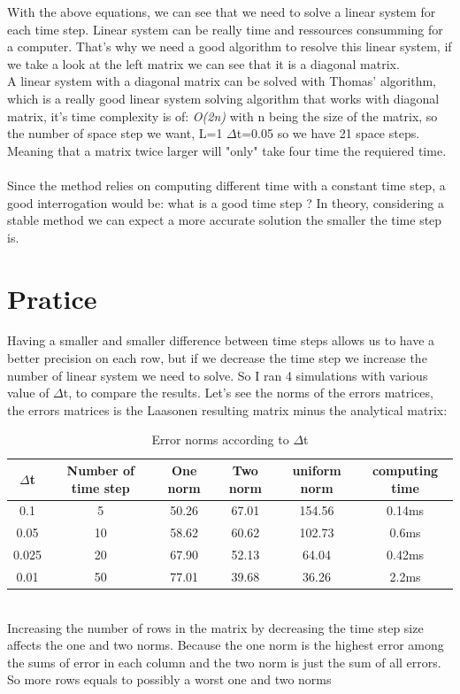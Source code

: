 \documentclass[12pt, a4paper]{report}
\begin{document}
With the above equations, we can see that we need to solve a linear system for each time step. Linear system can be really time and ressources consumming for a computer. That's why we need a good algorithm to resolve this linear system, if we take a look at the left matrix we can see that it is a diagonal matrix.\\
A linear system with a diagonal matrix can be solved with Thomas' algorithm, which is a really good linear system solving algorithm that works with diagonal matrix, it's time complexity is of:  \textit{O(2n)} with n being the size of the matrix, so the number of space step we want, L=1 $\Delta$t=0.05 so we have 21 space steps. Meaning that a matrix twice larger will "only" take four time the requiered time.
\paragraph{}
Since the method relies on computing different time with a constant time step, a good interrogation would be: what is a good time step ? In theory, considering a stable method we can expect a more accurate solution the smaller the time step is.

\section{Pratice} 
Having a smaller and smaller difference between time steps allows us to have a better precision on each row, but if we decrease the time step we increase the number of linear system we need to solve. So I ran 4 simulations with various value of $\Delta$t, to compare the results. Let's see the norms of the errors matrices, the errors matrices is the Laasonen resulting matrix minus the analytical matrix:
\begin{table}[ht]
\centering
\begin{tabular}{c c c c c c}
\toprule
$\Delta$t&Number of time step&One norm&Two norm&uniform norm&computing time\\
\midrule
0.1 &5&50.26&67.01&154.56&0.14ms\\
0.05 &10&58.62&60.62&102.73&0.6ms\\
0.025 &20&67.90&52.13&64.04&0.42ms\\
0.01 &50&77.01&39.68&36.26&2.2ms\\
\end{tabular}
\caption{Error norms according to $\Delta$t}
\end{table} \\
Increasing the number of rows in the matrix by decreasing the time step size affects the one and two norms. Because the one norm is the highest error among the sums of error in each column and the two norm is just the sum of all errors. So more rows equals to possibly a worst one and two norms\\
\end{document}
